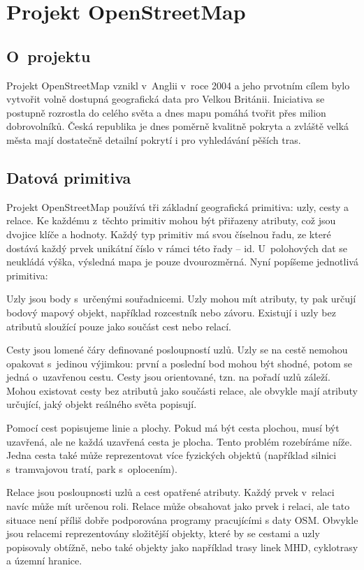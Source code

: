\chapter{Projekt OpenStreetMap}
\section{O~projektu}
Projekt OpenStreetMap \cite{osmweb} vznikl v~Anglii v~roce 2004 a jeho prvotním cílem bylo
vytvořit volně dostupná geografická data pro Velkou Británii. Iniciativa se
postupně rozrostla do celého světa a dnes mapu pomáhá tvořit přes milion
dobrovolníků. Česká republika je dnes poměrně kvalitně pokryta a zvláště velká
města mají dostatečně detailní pokrytí i pro vyhledávání pěších tras.

\section{Datová primitiva} 
Projekt OpenStreetMap používá tři základní geografická primitiva: uzly, cesty a
relace. Ke každému z~těchto primitiv mohou být přiřazeny atributy, což jsou
dvojice klíče a hodnoty. Každý typ primitiv má svou číselnou řadu, ze které
dostává každý prvek unikátní číslo v rámci této řady -- id. 
U~polohových dat se neukládá výška, výsledná mapa je pouze dvourozměrná.
Nyní popíšeme jednotlivá primitiva:

{\tuc Uzly} jsou body s~určenými souřadnicemi. Uzly mohou mít atributy, ty pak
určují bodový mapový objekt, například rozcestník nebo závoru. Existují i uzly
bez atributů sloužící pouze jako součást cest nebo relací.

{\tuc Cesty} jsou lomené čáry definované posloupností uzlů. Uzly se na cestě nemohou opakovat
s~jedinou výjimkou: první a poslední bod mohou být shodné, potom se jedná
o~uzavřenou cestu. Cesty jsou orientované, tzn. na pořadí uzlů záleží. Mohou
existovat cesty bez atributů jako součásti relace, ale obvykle mají atributy
určující, jaký objekt reálného světa popisují.

Pomocí cest popisujeme linie a plochy. Pokud má být cesta plochou, musí být
uzavřená, ale ne každá uzavřená cesta je plocha. Tento problém rozebíráme níže.
Jedna cesta také může reprezentovat více fyzických objektů (například silnici
s~tramvajovou tratí, park s~oplocením).

{\tuc Relace} jsou posloupnosti uzlů a cest opatřené atributy. Každý prvek
v~relaci navíc může mít určenou roli. Relace může obsahovat jako prvek i relaci,
ale tato situace není příliš dobře podporována programy pracujícími s daty OSM. 
Obvykle jsou relacemi reprezentovány složitější objekty, které by se cestami a
uzly popisovaly obtížně, nebo také  objekty jako například
trasy linek MHD, cyklotrasy a územní hranice.

